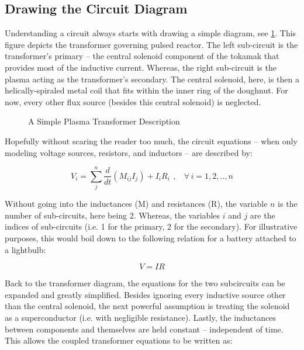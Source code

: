 \subsection{Drawing the Circuit Diagram}

Understanding a circuit always starts with drawing a simple diagram, see \cref{fig:circuit_diagram}. This figure depicts the transformer governing pulsed reactor. The left sub-circuit is the transformer's primary -- the central solenoid component of the tokamak that provides most of the inductive current. Whereas, the right sub-circuit is the plasma acting as the transformer's secondary. The central solenoid, here, is then a helically-spiraled metal coil that fits within the inner ring of the doughnut. For now, every other flux source (besides this central solenoid) is neglected.

\begin{figure}[h!]
\centering

\caption{A Simple Plasma Transformer Description}
\label{fig:circuit_diagram}
\end{figure}

Hopefully without scaring the reader too much, the circuit equations -- when only modeling voltage sources, resistors, and inductors -- are described by:

\begin{equation}
	V_i = \sum_j^n \frac{d}{dt} \left( M_{ij} I_j \right) + I_i R_i \ \, , \ \ \ \ \forall \, i = 1,2,..,n
\end{equation}

Without going into the inductances (M) and resistances (R), the variable $n$ is the number of sub-circuits, here being 2. Whereas, the variables $i$ and $j$ are the indices of sub-circuits (i.e. 1 for the primary, 2 for the secondary). For illustrative purposes, this would boil down to the following relation for a battery attached to a lightbulb:

\begin{equation}
	V = I R
\end{equation}

Back to the transformer diagram, the equations for the two subcircuits can be expanded and greatly simplified. Besides ignoring every inductive source other than the central solenoid, the next powerful assumption is treating the solenoid as a superconductor (i.e. with negligible resistance). Lastly, the inductances between components and themselves are held constant -- independent of time. This allows the coupled transformer equations to be written as:


